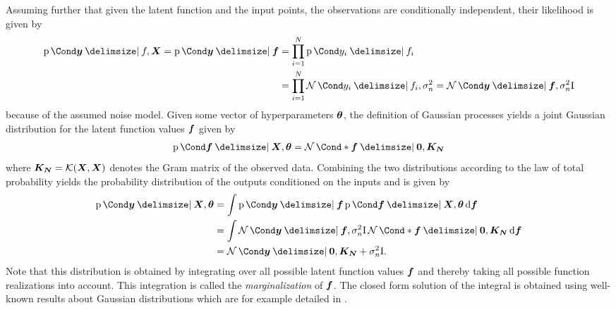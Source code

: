 Assuming further that given the latent function and the input points, the observations are conditionally independent, their likelihood is given by
\begin{align}
    \Prob{\mat{y} \given f, \mat{X}} = \Prob{\mat{y} \given \mat{f}} &= \prod_{i = 1}^N \Prob{y_i \given f_i} \\
    &= \prod_{i = 1}^N \Gaussian{y_i \given f_i, \sigma_n^2} = \Gaussian{\mat{y} \given \mat{f}, \sigma_n^2 \Eye}
\end{align}
because of the assumed noise model.
Given some vector of hyperparameters $\bm{\theta}$, the definition of Gaussian processes yields a joint Gaussian distribution for the latent function values $\bm{f}$ given by
\begin{align}
    \Prob{\mat{f} \given \mat{X}, \mat{\theta}} = \Gaussian*{\mat{f} \given \mat{0}, \mat{K_N}}
\end{align}
where $\bm{K_N} = \operatorname{\mathcal{K}}(\bm{X}, \bm{X})$ denotes the Gram matrix of the observed data.
Combining the two distributions according to the law of total probability yields the probability distribution of the outputs conditioned on the inputs and is given by
\begin{align}
    \Prob{\mat{y} \given \mat{X}, \mat{\theta}} &= \int \Prob{\mat{y} \given \mat{f}} \Prob{\mat{f} \given \mat{X}, \mat{\theta}} \diff \mat{f}\label{eq:gp_marginal_likelihood} \\
    &= \int \Gaussian{\mat{y} \given \mat{f}, \sigma_n^2 \Eye} \Gaussian*{\mat{f} \given \mat{0}, \mat{K_N}} \diff \mat{f} \\
    &= \Gaussian{\mat{y} \given \mat{0}, \mat{K_N} + \sigma_n^2 \Eye}.
\end{align}
Note that this distribution is obtained by integrating over all possible latent function values $\bm{f}$ and thereby taking all possible function realizations into account.
This integration is called the \emph{marginalization} of $\bm{f}$.
The closed form solution of the integral is obtained using well-known results about Gaussian distributions which are for example detailed in \cite{petersen_matrix_2008}.

